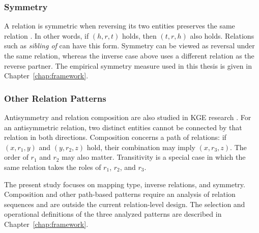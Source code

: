 \subsubsection{Symmetry}

A relation is symmetric when reversing its two entities preserves the same
relation \citep{sun2019rotate,zhu2024rotation}. In other words, if
$(h,r,t)$ holds, then $(t,r,h)$ also holds. Relations such as \emph{sibling of}
can have this form. Symmetry can be viewed as reversal under the same relation,
whereas the inverse case above uses a different relation as the reverse
partner. The empirical symmetry measure used in this thesis is given in
Chapter~\ref{chap:framework}.

\subsubsection{Other Relation Patterns}

Antisymmetry and relation composition are also studied in KGE research
\citep{sun2019rotate,zhu2024rotation}. For an antisymmetric relation, two
distinct entities cannot be connected by that relation in both directions.
Composition concerns a path of relations: if $(x,r_1,y)$ and $(y,r_2,z)$ hold,
their combination may imply $(x,r_3,z)$. The order of $r_1$ and $r_2$ may also
matter. Transitivity is a special case in which the same relation takes the
roles of $r_1$, $r_2$, and $r_3$.

The present study focuses on mapping type, inverse relations, and symmetry.
Composition and other path-based patterns require an analysis of relation
sequences and are outside the current relation-level design. The selection and
operational definitions of the three analyzed patterns are described in
Chapter~\ref{chap:framework}.
